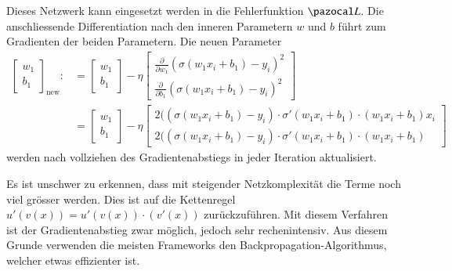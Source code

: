 Dieses Netzwerk kann eingesetzt werden in die Fehlerfunktion $\Lb$. Die anschliessende Differentiation nach den inneren Parametern $w$ und $b$ führt zum Gradienten der beiden Parametern. Die neuen Parameter 
\begin{equation}
\begin{split}
\begin{bmatrix}w_{1}\\b_{1}\end{bmatrix}_{\text{new}}:&={\begin{bmatrix}w_{1}\\b_{1}\end{bmatrix}}-\eta {\begin{bmatrix}
{\frac {\partial }{\partial w_{1}}}(\sigma(w_{1}x_{i}+b_{1})-y_{i})^{2}\\
{\frac {\partial }{\partial b_{1}}}(\sigma(w_{1}x_{i}+b_{1})-y_{i})^{2}\end{bmatrix}} \\ & =
{\begin{bmatrix}w_{1}\\b_{1}\end{bmatrix}}-\eta {\begin{bmatrix}2((\sigma(w_{1}x_{i}+b_{1}) - y_i) \cdot \sigma'(w_{1}x_{i}+b_{1}) \cdot (w_{1}x_{i}+b_{1}) x_{i} \\2((\sigma(w_{1}x_{i}+b_{1}) - y_i) \cdot \sigma'(w_{1}x_{i}+b_{1}) \cdot (w_{1}x_{i}+b_{1}) \end{bmatrix}}
\end{split}
\end{equation}
werden nach vollziehen des Gradientenabstiegs in jeder Iteration aktualisiert.

Es ist unschwer zu erkennen, dass mit steigender Netzkomplexität die Terme noch viel grösser werden. Dies ist auf die Kettenregel $u'(v(x)) = u'(v(x)) \cdot (v'(x))$ zurückzuführen. Mit diesem Verfahren ist der Gradientenabstieg zwar möglich, jedoch sehr rechenintensiv. Aus diesem Grunde verwenden die meisten Frameworks den Backpropagation-Algorithmus, welcher etwas effizienter ist.
